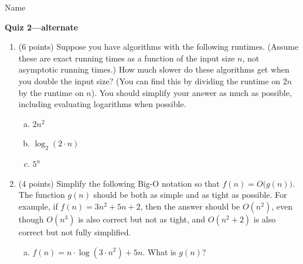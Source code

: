 \documentclass[11pt]{article}
\begin{document}
\noindent Name \underline{\hspace{12cm}}\\


\begin{center}
\LARGE\textbf{Quiz 2---alternate}%
\end{center}



\begin{enumerate}

 
\item (6 points) Suppose you have algorithms with the following runtimes.
(Assume these are exact running times as a function of the input size $n$, not
asymptotic running times.) How much slower do these algorithms get when you
double the input size? (You can find this by dividing the runtime on $2n$ by the
runtime on $n$). You should simplify your answer as much as possible, including evaluating
logarithms when possible.

\begin{enumerate}[(a)]
    \item $2n^2$ 
\vspace{1in}
    \item $\log_2 (2 \cdot n)$
\vspace{1in}
    \item $5^{n}$
\end{enumerate}
\vspace{1in}

\item (4 points) Simplify the following Big-O notation so that $f(n) = O\Big(g(n)\Big)$. The function $g(n)$ should be
        both as simple and as tight as possible. For example, if $f(n) = 3n^2 + 5n + 2$,
        then the answer should be $O(n^2)$, even though $O(n^3)$ is also correct but not as tight, and $O(n^2+2)$ is also
        correct but not fully simplified.

\begin{enumerate}[(a)]
    \item $f(n) = n \cdot \log(3\cdot n^{2}) + 5n$. What is $g(n)$?
\end{enumerate}
        

\end{enumerate}
\end{document}
